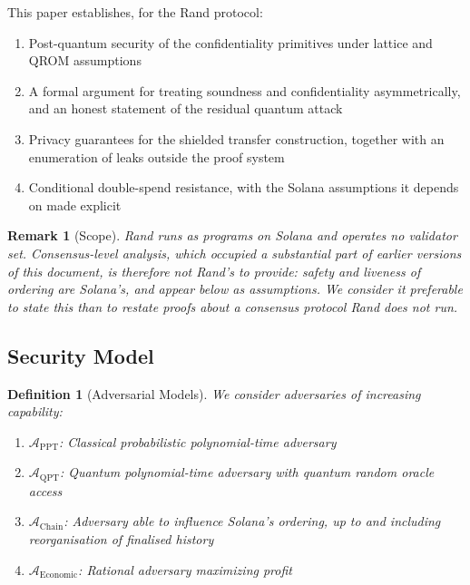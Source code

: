 \documentclass[11pt,a4paper]{article}
\newtheorem{definition}[theorem]{Definition}
\newtheorem{remark}[theorem]{Remark}
\begin{document}
This paper establishes, for the Rand protocol:
\begin{enumerate}
    \item Post-quantum security of the confidentiality primitives under lattice and QROM assumptions
    \item A formal argument for treating soundness and confidentiality asymmetrically, and an honest statement of the residual quantum attack
    \item Privacy guarantees for the shielded transfer construction, together with an enumeration of leaks outside the proof system
    \item Conditional double-spend resistance, with the Solana assumptions it depends on made explicit
\end{enumerate}

\begin{remark}[Scope]
Rand runs as programs on Solana and operates no validator set. Consensus-level analysis, which occupied a substantial part of earlier versions of this document, is therefore not Rand's to provide: safety and liveness of ordering are Solana's, and appear below as assumptions. We consider it preferable to state this than to restate proofs about a consensus protocol Rand does not run.
\end{remark}

\subsection{Security Model}

\begin{definition}[Adversarial Models]
We consider adversaries of increasing capability:
\begin{enumerate}
    \item $\mathcal{A}_{\text{PPT}}$: Classical probabilistic polynomial-time adversary
    \item $\mathcal{A}_{\text{QPT}}$: Quantum polynomial-time adversary with quantum random oracle access
    \item $\mathcal{A}_{\text{Chain}}$: Adversary able to influence Solana's ordering, up to and including reorganisation of finalised history
    \item $\mathcal{A}_{\text{Economic}}$: Rational adversary maximizing profit
\end{enumerate}
\end{definition}

\end{document}
